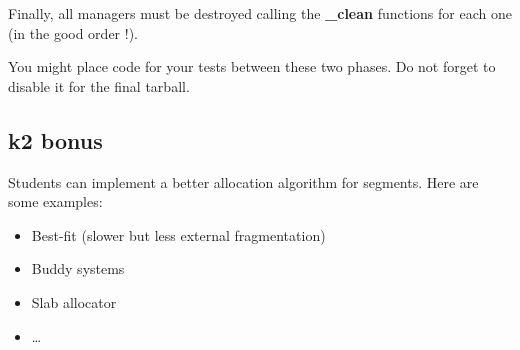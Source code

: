 Finally, all  managers must be destroyed  calling the \textbf{\_clean}
functions for each one (in the good order !).

You might place  code for your tests between these  two phases. Do not
forget to disable it for the final tarball.

%
%

\subsection{k2 bonus}

Students can implement a better allocation algorithm for
segments. Here are some examples:

\begin{itemize}

\item Best-fit (slower but less external fragmentation)
\item Buddy systems
\item Slab allocator
\item \ldots

\end{itemize}
